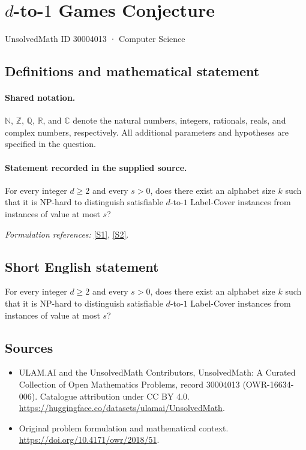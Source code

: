 \documentclass[11pt]{article}
\newcommand{\sref}[2]{\hyperlink{source:#1:#2}{[S#2]}}
\begin{document}
\setcounter{section}{30004012}
\section{\texorpdfstring{$d$-to-$1$ Games Conjecture}{d-to-1 Games Conjecture}}\label{30004013}
{\small UnsolvedMath ID 30004013 · Computer Science}
\subsection{Definitions and mathematical statement}

\paragraph{Shared notation.}$\mathbb N$, $\mathbb Z$, $\mathbb Q$, $\mathbb R$, and $\mathbb C$ denote the natural numbers, integers, rationals, reals, and complex numbers, respectively. All additional parameters and hypotheses are specified in the question.


\paragraph{Statement recorded in the supplied source.}
For every integer $d\geq2$ and every $s>0$, does there exist an alphabet size $k$ such that it is NP-hard to distinguish satisfiable $d$-to-$1$ Label-Cover instances from instances of value at most $s$?
\par\smallskip\textit{Formulation references:} \sref{30004013}{1}, \sref{30004013}{2}.
\subsection{Short English statement}
For every integer $d\geq2$ and every $s>0$, does there exist an alphabet size $k$ such that it is NP-hard to distinguish satisfiable $d$-to-$1$ Label-Cover instances from instances of value at most $s$?
\subsection{Sources}
\begin{itemize}
\item[\hypertarget{source:30004013:1}{S1}] ULAM.AI and the UnsolvedMath Contributors, UnsolvedMath: A Curated Collection of Open Mathematics Problems, record 30004013 (OWR-16634-006). Catalogue attribution under CC BY 4.0.
\url{https://huggingface.co/datasets/ulamai/UnsolvedMath}.
\item[\hypertarget{source:30004013:2}{S2}] Original problem formulation and mathematical context.
\url{https://doi.org/10.4171/owr/2018/51}.
\end{itemize}
\label{end:30004013}
\end{document}
